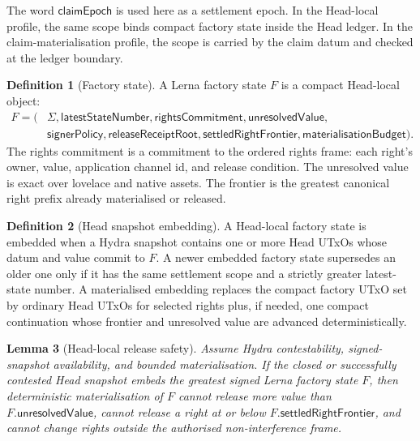 \documentclass[a4paper,11pt]{article}
\theoremstyle{definition}
\newtheorem{definition}{Definition}[section]
\theoremstyle{plain}
\newtheorem{lemma}[definition]{Lemma}
\theoremstyle{remark}
\begin{document}
The word \(\mathsf{claimEpoch}\) is used here as a settlement epoch. In the
Head-local profile, the same scope binds compact factory state inside the Head
ledger. In the claim-materialisation profile, the scope is carried by the claim
datum and checked at the ledger boundary.

\begin{definition}[Factory state]
\label{def:factory-state}
A Lerna factory state \(F\) is a compact Head-local object:
\[
\begin{aligned}
F = (&\Sigma,\mathsf{latestStateNumber},\mathsf{rightsCommitment},
\mathsf{unresolvedValue},\\
&\mathsf{signerPolicy},\mathsf{releaseReceiptRoot},
\mathsf{settledRightFrontier},\mathsf{materialisationBudget}).
\end{aligned}
\]
The rights commitment is a commitment to the ordered rights frame: each right's
owner, value, application channel id, and release condition. The unresolved
value is exact over lovelace and native assets. The frontier is the greatest
canonical right prefix already materialised or released.
\end{definition}

\begin{definition}[Head snapshot embedding]
\label{def:head-snapshot-embedding}
A Head-local factory state is embedded when a Hydra snapshot contains one or
more Head UTxOs whose datum and value commit to \(F\). A newer embedded factory
state supersedes an older one only if it has the same settlement scope and a
strictly greater latest-state number. A materialised embedding replaces the
compact factory UTxO set by ordinary Head UTxOs for selected rights plus, if
needed, one compact continuation whose frontier and unresolved value are
advanced deterministically.
\end{definition}

\begin{lemma}[Head-local release safety]
\label{lem:head-local-safety}
Assume Hydra contestability, signed-snapshot availability, and bounded
materialisation. If the closed or successfully contested Head snapshot embeds
the greatest signed Lerna factory state \(F\), then deterministic
materialisation of \(F\) cannot release more value than \(F.\mathsf{unresolvedValue}\),
cannot release a right at or below \(F.\mathsf{settledRightFrontier}\), and cannot
change rights outside the authorised non-interference frame.
\end{lemma}
\end{document}
